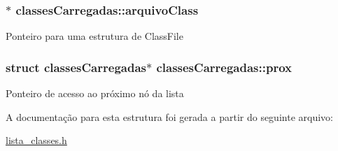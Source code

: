 \subsubsection[{\texorpdfstring{arquivo\+Class}{arquivoClass}}]{$\ast$ classes\+Carregadas\+::arquivo\+Class}\hypertarget{structclassesCarregadas_a0bd56a3a1fe9cef7e3cd63a947cb2edb}{}\label{structclassesCarregadas_a0bd56a3a1fe9cef7e3cd63a947cb2edb}
Ponteiro para uma estrutura de Class\+File 
\subsubsection[{\texorpdfstring{prox}{prox}}]{\setlength{\rightskip}{0pt plus 5cm}struct {\bf classes\+Carregadas}$\ast$ classes\+Carregadas\+::prox}\hypertarget{structclassesCarregadas_a9be874f129111fad8157f3e4205e9e98}{}\label{structclassesCarregadas_a9be874f129111fad8157f3e4205e9e98}
Ponteiro de acesso ao próximo nó da lista 

A documentação para esta estrutura foi gerada a partir do seguinte arquivo\+:\begin{DoxyCompactItemize}
\item 
\hyperlink{lista__classes_8h}{lista\+\_\+classes.\+h}\end{DoxyCompactItemize}

